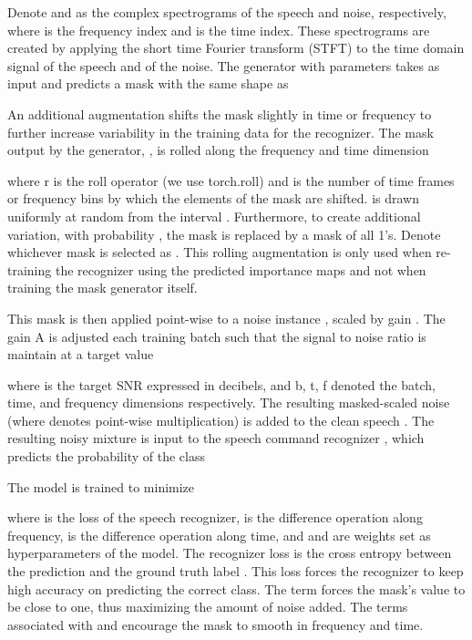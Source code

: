 \documentclass{article}
\begin{document}
Denote  and  as the complex spectrograms of the speech and noise, respectively, where  is the frequency index and  is the time index. These spectrograms are created by applying the short time Fourier transform (STFT) to the time domain signal  of the speech and  of the noise. The generator  with parameters  takes  as input and predicts a mask  with the same shape as 



An additional augmentation shifts the mask slightly in time or frequency to further increase variability in the training data for the recognizer. The mask output by the generator, , is rolled along the frequency and time dimension 

where r is the roll operator (we use torch.roll) and  is the number of time frames or frequency bins by which the elements of the mask are shifted.  is drawn uniformly at random from the interval . 
Furthermore, to create additional variation, with probability , the mask  is replaced by a mask of all 1's. Denote whichever mask is selected as .
This rolling augmentation is only used when re-training the recognizer using the predicted importance maps and not when training the mask generator itself.



This mask is then applied point-wise to a noise instance , scaled by gain . 
The gain A is adjusted each training batch such that the signal to noise ratio is maintain at a target value

where  is the target SNR expressed in decibels, and b, t, f denoted the batch, time, and frequency dimensions respectively. The resulting masked-scaled noise  (where  denotes point-wise multiplication) is added to the clean speech . The resulting noisy mixture is input to the speech command recognizer , which predicts the probability of the class 





The model is trained to minimize

where  is the loss of the speech recognizer,  is the difference operation along frequency,  is the difference operation along time, and  and  are weights set as hyperparameters of the model. The recognizer loss is the cross entropy between the prediction  and the ground truth label . This loss forces the recognizer to keep high accuracy on predicting the correct class. The  term forces the mask's value to be close to one, thus maximizing the amount of noise added. The terms associated with  and  encourage the mask to smooth in frequency and time. 
\end{document}
